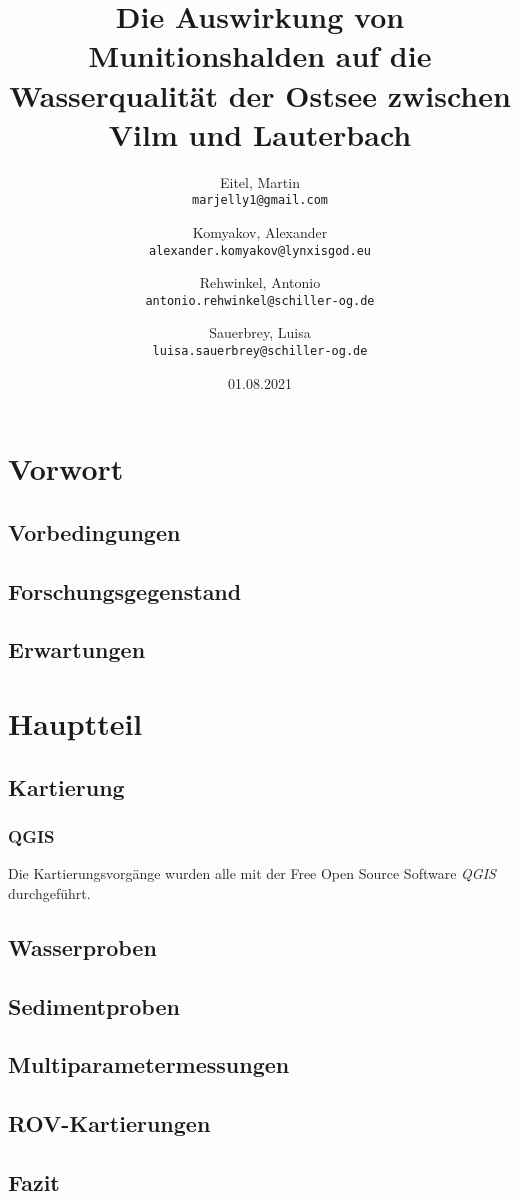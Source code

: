 \documentclass[12pt,titlepage]{scrreprt}
\begin{document}
\begin{titlepage}
\title{Die Auswirkung von Munitionshalden auf die Wasserqualität der Ostsee zwischen Vilm und Lauterbach}
\date{01.08.2021}
\author{Eitel, Martin \\ \texttt{marjelly1@gmail.com}\and Komyakov, Alexander \\\texttt{alexander.komyakov@lynxisgod.eu} \\ \and Rehwinkel, Antonio \\ \texttt{antonio.rehwinkel@schiller-og.de} \\ \and Sauerbrey, Luisa \\ \texttt{luisa.sauerbrey@schiller-og.de}}
\maketitle
\end{titlepage}
\tableofcontents
\chapter{Vorwort}
\section{Vorbedingungen}
\section{Forschungsgegenstand}
\section{Erwartungen}
\chapter{Hauptteil}
\section{Kartierung}
    \subsection*{QGIS}
    Die Kartierungsvorgänge wurden alle mit der Free Open Source Software \emph{QGIS}\cite{qgis} durchgeführt.
    
\section{Wasserproben}
\section{Sedimentproben}
\section{Multiparametermessungen}
\section{ROV-Kartierungen}
\section{Fazit}
{}

\end{document}
